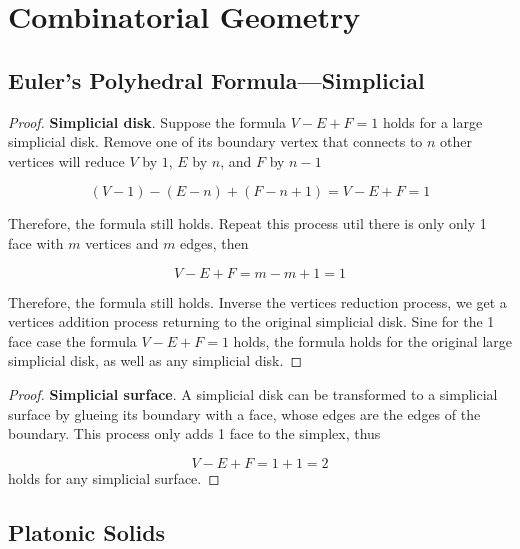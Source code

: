 \setcounter{chapter}{-1}
\chapter{Combinatorial Geometry}

\section{Euler’s Polyhedral Formula—Simplicial}

\begin{proof}
    \textbf{Simplicial disk}. Suppose the formula $V - E + F = 1$ holds for a large simplicial disk. Remove one of its boundary vertex that connects to $n$ other vertices will reduce $V$ by $1$, $E$ by $n$, and $F$ by $n - 1$

    \begin{equation}
        (V - 1) - (E - n) + (F - n + 1) = V - E + F = 1
    \end{equation}

    Therefore, the formula still holds. Repeat this process util there is only only 1 face with $m$ vertices and $m$ edges, then

    \begin{equation}
        V - E + F = m - m + 1 = 1
    \end{equation}

    Therefore, the formula still holds. Inverse the vertices reduction process, we get a vertices addition process returning to the original simplicial disk. Sine for the 1 face case the formula $V - E + F = 1$ holds, the formula holds for the original large simplicial disk, as well as any simplicial disk.
\end{proof}

\begin{proof}
    \textbf{Simplicial surface}. A simplicial disk can be transformed to a simplicial surface by glueing its boundary with a face, whose edges are the edges of the boundary. This process only adds 1 face to the simplex, thus

    \begin{equation}
        V - E + F = 1 + 1 = 2
    \end{equation}
    holds for any simplicial surface.
\end{proof}

\section{Platonic Solids}

